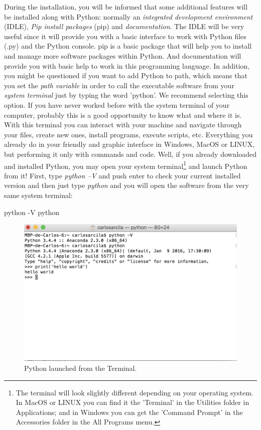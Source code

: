 During the installation, you will be informed that some additional features will be installed along with Python: normally an \textit{integrated development environment} (IDLE), \textit{Pip install packages} (pip) and \textit{documentation}. The IDLE will be very useful since it will provide you with a basic interface to work with Python files (.py) and the Python console. pip is a basic package that will help you to install and manage more software packages within Python. And documentation will provide you with basic help to work in this programming language.  In addition, you might be questioned if you want to add Python to path, which means that you set the \textit{path variable} in order to call the executable software from your \textit{system terminal} just by typing the word 'python'. We recommend selecting this option.  If you have never worked before with the system terminal of your computer, probably this is a good opportunity to know what and where it is. With this terminal you can interact with your machine and navigate through your files, create new ones, install programs, execute scripts, etc.  Everything you already do in your friendly and graphic interface in Windows, MacOS or LINUX, but performing it only with commands and code. Well, if you already downloaded and installed Python, you may open your system terminal\footnote{The terminal will look slightly different depending on your operating system. In MacOS or LINUX you can find it the 'Terminal' in the Utilities folder in Applications; and in Windows you can get the 'Command Prompt' in the Accessories folder in the All Programs menu.}  and launch Python from it! First, type \textit{python –V} and push enter to check your current installed version and then just type \textit{python} and you will open the software from the very same system terminal:

\begin{terminal}
python -V
python
\end{terminal}

\begin{figure}
\centering
\includegraphics[width=0.9\linewidth]{figures/ch3_python_from_terminal}
\caption{Python launched from the Terminal.}
\label{fig:python_from_terminal}
\end{figure}


